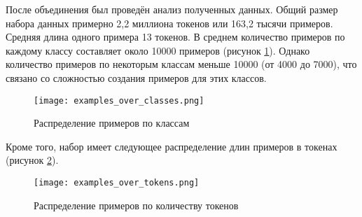 После объединения был проведён анализ полученных данных. Общий размер набора данных примерно 2,2 миллиона токенов или 163,2 тысячи 
примеров. Средняя длина одного примера 13 токенов. 
В среднем количество примеров по каждому классу составляет около 10000 примеров (рисунок \ref{classnumbers:image}). 
Однако количество примеров по некоторым классам меньше 10000 (от 4000 до 7000), что связано со сложностью создания примеров для 
этих классов.
\begin{figure}[H]
   \begin{center}
      \texttt{[image: examples\_over\_classes.png]}
      \caption{Распределение примеров по классам}
      \label{classnumbers:image}
   \end{center}
\end{figure}

Кроме того, набор имеет следующее распределение длин примеров в токенах (рисунок \ref{tokennumbers:image}).
\begin{figure}[H]
   \begin{center}
      \texttt{[image: examples\_over\_tokens.png]}
      \caption{Распределение примеров по количеству токенов}
      \label{tokennumbers:image}
   \end{center}
\end{figure}

